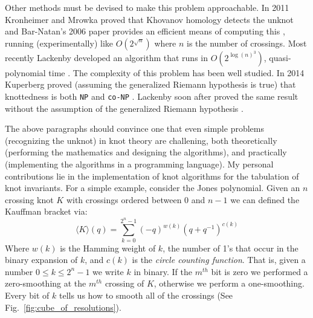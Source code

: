 \documentclass{article}
\theoremstyle{plain}
\begin{document}
        Other methods must be devised to make this problem approachable.
        In 2011 Kronheimer and Mrowka proved that Khovanov homology detects the
        unknot \cite{KronheimerMrowka2011KhovanovUnknot} and Bar-Natan's 2006
        paper provides an efficient means of computing this
        \cite{BarNatan2006FASTKH}, running (experimentally) like
        $O(2^{\sqrt{n}})$ where $n$ is the number of crossings. Most recently
        Lackenby developed an algorithm that runs in
        $O(2^{\log(n)^{3}})$, quasi-polynomial time
        \cite{LackenBy2021QuasiPolyUnknotting}. The complexity of this problem
        has been well studied. In 2014 Kuperberg proved (assuming the generalized
        Riemann hypothesis is true) that knottedness is both \texttt{NP} and
        \texttt{co-NP} \cite{Kuperberg2014KnottednessNP}. Lackenby soon after
        proved the same result without the assumption of the generalized
        Riemann hypothesis \cite{Lackenby2021UnknotNP}.
        \par\hfill\par
        The above paragraphs should convince one that even simple problems
        (recognizing the unknot) in knot theory are challening,
        both theoretically (performing the mathematics and designing the
        algorithms), and practically (implementing the algorithms
        in a programming language).
        My personal contributions lie in the implementation of knot algorithms
        for the tabulation of knot invariants. For a simple example,
        consider the Jones polynomial. Given an $n$ crossing knot $K$
        with crossings ordered between $0$ and $n-1$ we can defined the
        Kauffman bracket via:
        \begin{equation}
            \langle{K}\rangle(q)
            =\sum_{k=0}^{2^{n}-1}(-q)^{w(k)}(q+q^{-1})^{c(k)}
        \end{equation}
        Where $w(k)$ is the Hamming weight of $k$, the number of 1's that occur
        in the binary expansion of $k$, and $c(k)$ is the
        \textit{circle counting function}. That is, given a number
        $0\leq{k}\leq{2}^{n}-1$ we write $k$ in binary. If the $m^{th}$ bit is
        zero we performed a zero-smoothing at the $m^{th}$ crossing of $K$,
        otherwise we perform a one-smoothing. Every bit of $k$ tells us how to
        smooth all of the crossings (See Fig.~\ref{fig:cube_of_resolutions}).
\end{document}
